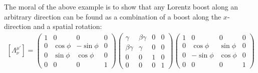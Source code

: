 \documentclass{article}
\theoremstyle{definition}
\begin{document}
The moral of the above example is to show that any Lorentz boost along an arbitrary direction can be found as a combination of a boost along the $x$-direction and a spatial rotation:
\begin{align*}
\boxed{
[\Lambda^{\mu'}_\nu] = 
\begin{pmatrix}
1 & 0 & 0 & 0 \\
0 & \cos\phi & -\sin\phi & 0\\
0 & \sin\phi & \cos\phi & 0\\
0 & 0 & 0 & 1
\end{pmatrix}
\begin{pmatrix}
\gamma & \beta\gamma & 0 & 0\\
\beta\gamma & \gamma & 0 & 0\\
0 & 0 & 1 & 0\\
0 & 0 & 0 & 1
\end{pmatrix}
\begin{pmatrix}
1 & 0 & 0 & 0 \\
0 & \cos\phi & \sin\phi & 0\\
0 & -\sin\phi & \cos\phi & 0\\
0 & 0 & 0 & 1
\end{pmatrix}}
\end{align*}
\end{document}
